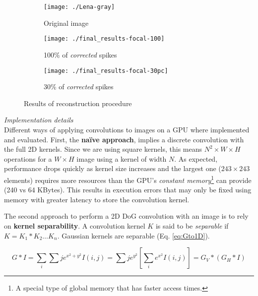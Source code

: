 \begin{figure}[hbt]
  \centering
  \begin{subfigure}[t]{0.3\textwidth}
    \centering
    \captionsetup{justification=centering,margin=0.1cm}
    \texttt{[image: ./Lena-gray]}
    \caption{Original image}
    \label{pic-original-lena}
  \end{subfigure}
  \begin{subfigure}[t]{0.3\textwidth}
    \centering
    \captionsetup{justification=centering,margin=0.1cm}
    \texttt{[image: ./final\_results-focal-100]}
    \caption{100\% of \emph{corrected} spikes}
    \label{pic-100pc-spikes}
  \end{subfigure}
  \begin{subfigure}[t]{0.3\textwidth}
    \centering
    \captionsetup{justification=centering,margin=0.1cm}
    \texttt{[image: ./final\_results-focal-30pc]}
    \caption{30\% of \emph{corrected} spikes}
    \label{pic-30pc-spikes}
  \end{subfigure}
  \caption{Results of reconstruction procedure}
  \label{fig-reconstruction}
  \vspace*{-10pt}
\end{figure}
\vspace*{0.5cm}

\hspace*{-0.65cm}\emph{Implementation details}\\[0.3cm]
Different ways of applying convolutions to images on a GPU where implemented and evaluated. First, the \textbf{naïve approach}, implies a discrete convolution with the full 2D kernels. Since we are using square kernels, this means $N^2 \times W \times H$ operations for a $W\times H$ image using a kernel of width $N$. As expected, performance drops quickly as kernel size increases and the largest one ($243\times243$ elements) requires more resources than the GPU's \emph{constant memory}\footnote{A special type of global memory that has faster access times.} can provide (240 vs 64 KBytes). This results in execution errors that may only be fixed using memory with greater latency to store the convolution kernel. 


The second approach to perform a 2D DoG convolution with an image is to rely on \textbf{kernel separability}. A convolution kernel $K$ is said to be \emph{separable} if $K = K_{1} \ast K_{2} \dots K_{n}$. Gaussian kernels are separable (Eq. \ref{eq:Gto1D}). 

\begin{equation}
  G \ast I = \sum_{i} \sum{j} e^{x^2 + y^2}I(i, j)  = \sum{j} e^{y^2}\left[ \sum_{i} e^{x^2}I(i, j) \right] = G_V \ast ( G_H \ast I)
  \label{eq:Gto1D}
\end{equation}

